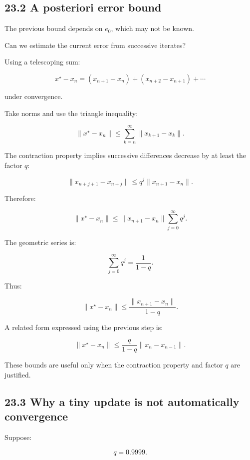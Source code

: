 \subsection{23.2 A posteriori error bound}\label{02-foundations-ii-ch028-a-posteriori-error-bound}

\hypertarget{02-foundations-ii-ch028-a-posteriori-error-bound}{}

The previous bound depends on \(e_0\), which may not be known.

Can we estimate the current error from successive iterates?

Using a telescoping sum:

\[ x^\star-x_n = (x_{n+1}-x_n) + (x_{n+2}-x_{n+1}) +\cdots \]

under convergence.

Take norms and use the triangle inequality:

\[ \|x^\star-x_n\| \le \sum_{k=n}^{\infty} \|x_{k+1}-x_k\|. \]

The contraction property implies successive differences decrease by at least the factor \(q\):

\[ \|x_{n+j+1}-x_{n+j}\| \le q^j\|x_{n+1}-x_n\|. \]

Therefore:

\[ \|x^\star-x_n\| \le \|x_{n+1}-x_n\| \sum_{j=0}^{\infty}q^j. \]

The geometric series is:

\[ \sum_{j=0}^{\infty}q^j=\frac1{1-q}. \]

Thus:

\[ \boxed{ \|x^\star-x_n\| \le \frac{\|x_{n+1}-x_n\|}{1-q} }. \]

A related form expressed using the previous step is:

\[ \boxed{ \|x^\star-x_n\| \le \frac{q}{1-q}\|x_n-x_{n-1}\| }. \]

These bounds are useful only when the contraction property and factor \(q\) are justified.

\subsection{23.3 Why a tiny update is not automatically convergence}\label{02-foundations-ii-ch028-why-a-tiny-update-is-not-automatically-convergence}

\hypertarget{02-foundations-ii-ch028-why-a-tiny-update-is-not-automatically-convergence}{}

Suppose:

\[ q=0.9999. \]

